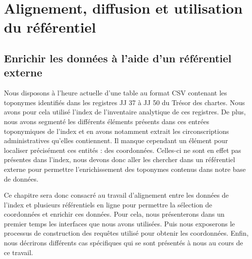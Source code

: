 \documentclass[a4paper,12pt,twoside]{book}
\makeatletter
\newcommand{\parttext}[1]{\def\@parttext{#1}}
\makeatother
\begin{document}
	\parttext{Si la constitution d'un référentiel à partir d'entrées d'index constitue l'objectif premier du stage, ce travail n'est pas suffisant pour fournir un outil pertinent afin d'étudier le contenu du Trésor des chartes. Les données constituées, pour être utiles, doivent en effet pouvoir rejoindre et compléter les différentes ontologies web déjà disponibles. Nous consacrerons donc cette troisième et dernière partie à la création de liens à partir du référentiel et à ses utilisations. L'objectif étant de l'insérer dans les connaissances générales disponibles sur les documents historiques. Pour cela, nous décrirons dans un premier chapitre le processus d'enrichissement du référentiel par son alignement avec des ontologies web. Puis nous dédierons un second chapitre à la mise à disposition du référentiel et aux liens réalisés avec les autres données du corpus. Enfin, nous consacrerons un troisième chapitre aux différents essais réalisés pour la mise en œuvre du liage d'entités.}
	
	\part{Alignement, diffusion et utilisation du référentiel}
	
	\chapter{Enrichir les données à l’aide d’un référentiel externe}
	
	Nous disposons à l'heure actuelle d'une table au format CSV contenant les toponymes identifiés dans les registres JJ 37 à JJ 50 du Trésor des chartes. Nous avons pour cela utilisé l'index de l'inventaire analytique de ces registres. De plus, nous avons segmenté les différents éléments présents dans ces entrées toponymiques de l'index et en avons notamment extrait les circonscriptions administratives qu'elles contiennent. Il manque cependant un élément pour localiser précisément ces entités : des coordonnées. Celles-ci ne sont en effet pas présentes dans l'index, nous devons donc aller les chercher dans un référentiel externe pour permettre l'enrichissement des toponymes contenus dans notre base de données.
	
	Ce chapitre sera donc consacré au travail d'alignement entre les données de l'index et plusieurs référentiels en ligne pour permettre la sélection de coordonnées et enrichir ces données. Pour cela, nous présenterons dans un premier temps les interfaces que nous avons utilisées. Puis nous exposerons le processus de construction des requêtes utilisé pour obtenir les coordonnées. Enfin, nous décrirons différents cas spécifiques qui se sont présentés à nous au cours de ce travail.
	
\end{document}
